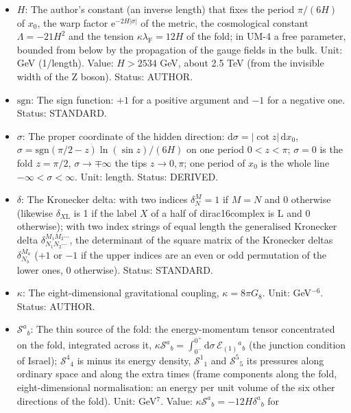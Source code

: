 \documentclass[
  10pt,
]{article}
\begin{document}
\begin{itemize}
  Status: STANDARD.
\item
  \(H\): The author's constant (an inverse length) that fixes the period
  \(\pi/(6H)\) of \(x_0\), the warp factor
  \(\mathrm{e}^{-2H\lvert\sigma\rvert}\) of the metric, the cosmological
  constant \(\Lambda = -21H^2\) and the tension
  \(\kappa\lambda_{\mathrm{F}} = 12H\) of the fold; in UM-4 a free
  parameter, bounded from below by the propagation of the gauge fields
  in the bulk. Unit: GeV (1/length). Value: \(H > 2534\) GeV, about 2.5
  TeV (from the invisible width of the Z boson). Status: AUTHOR.
\item
  \(\mathrm{sgn}\): The sign function: \(+1\) for a positive argument
  and \(-1\) for a negative one. Status: STANDARD.
\item
  \(\sigma\): The proper coordinate of the hidden direction:
  \(\mathrm{d}\sigma = \lvert\cot z\rvert\,\mathrm{d}x_0\),
  \(\sigma = \mathrm{sgn}(\pi/2 - z)\ln(\sin z)/(6H)\) on one period
  \(0 < z < \pi\); \(\sigma = 0\) is the fold \(z = \pi/2\),
  \(\sigma \to \mp\infty\) the tips \(z \to 0, \pi\); one period of
  \(x_0\) is the whole line \(-\infty < \sigma < \infty\). Unit: length.
  Status: DERIVED.
\item
  \(\delta\): The Kronecker delta: with two indices \(\delta^M_N = 1\)
  if \(M = N\) and 0 otherwise (likewise \(\delta_{X\mathrm{L}}\) is 1
  if the label \(X\) of a half of dirac16complex is L and 0 otherwise);
  with two index strings of equal length the generalised Kronecker delta
  \(\delta^{M_1M_2\cdots}_{N_1N_2\cdots}\), the determinant of the
  square matrix of the Kronecker deltas \(\delta^{M_a}_{N_b}\) (\(+1\)
  or \(-1\) if the upper indices are an even or odd permutation of the
  lower ones, 0 otherwise). Status: STANDARD.
\item
  \(\kappa\): The eight-dimensional gravitational coupling,
  \(\kappa = 8\pi G_8\). Unit: GeV\(^{-6}\). Status: AUTHOR.
\item
  \(\mathcal{S}^a{}_b\): The thin source of the fold: the
  energy-momentum tensor concentrated on the fold, integrated across it,
  \(\kappa\mathcal{S}^a{}_b = \int_{0^-}^{0^+}\mathrm{d}\sigma\,\mathcal{E}_{(1)}{}^a{}_b\)
  (the junction condition of Israel); \(\mathcal{S}^4{}_4\) is minus its
  energy density, \(\mathcal{S}^1{}_1\) and \(\mathcal{S}^5{}_5\) its
  pressures along ordinary space and along the extra times (frame
  components along the fold, eight-dimensional normalisation: an energy
  per unit volume of the six other directions of the fold). Unit:
  GeV\(^7\). Value: \(\kappa\mathcal{S}^a{}_b = -12H\delta^a{}_b\) for

\end{itemize}
\end{document}

